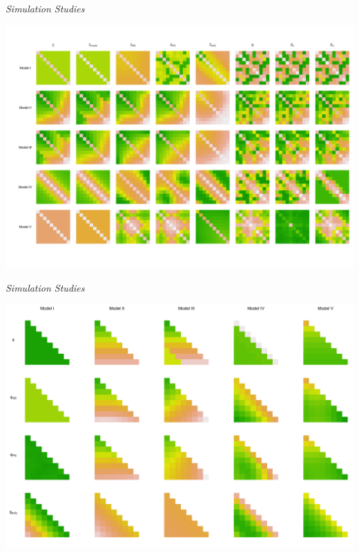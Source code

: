 \begin{frame}[c]{\emph{Simulation Studies}}{}
 
\begin{center}
 \includegraphics[width = \textwidth]{img/chapter-4/cov-estimate-lattice-beamer}%
\end{center}

\end{frame}


\begin{frame}[c]{\emph{Simulation Studies}}{}
 
\begin{center}
  \includegraphics[width = \textwidth]{img/chapter-4/cholesky-estimate-lattice-beamer}%
\end{center}

\end{frame}


